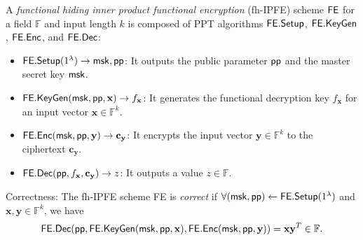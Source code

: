 \begin{definition}
\label{def:fh-IPFE}
	A \emph{functional hiding inner product functional encryption} (fh-IPFE) scheme $\sf FE$ for a field $\mathbb{F}$ and input length $k$ is composed of PPT algorithms ${\sf FE.Setup}$, ${\sf FE.KeyGen}$, ${\sf FE.Enc}$, and ${\sf FE.Dec}$:

	\begin{itemize}
	
		\item ${\sf FE.Setup}(1^\lambda) \to {\sf msk}, {\sf pp}$: It outputs the public parameter ${\sf pp}$ and the master secret key ${\sf msk}$.
	
		\item ${\sf FE.KeyGen}({\sf msk}, {\sf pp}, \mathbf{x}) \to f_\mathbf{x}$: It generates the functional decryption key $f_\mathbf{x}$ for an input vector $\mathbf{x} \in \mathbb{F}^k$. 
	
		\item ${\sf FE.Enc}({\sf msk}, {\sf pp}, \mathbf{y}) \to \mathbf{c_y}$: It encrypts the input vector $\mathbf{y} \in \mathbb{F}^k$ to the ciphertext $\mathbf{c_y}$. 
	
		\item ${\sf FE.Dec}({\sf pp}, f_\mathbf{x}, \mathbf{c_y}) \to z$: It outputs a value $z \in \mathbb{F}$.
	
	\end{itemize}
	
	\noindent Correctness: The fh-IPFE scheme {\sf FE} is \emph{correct} if $\forall ({\sf msk}, {\sf pp}) \gets {\sf FE.Setup}(1^\lambda)$ and $ \mathbf{x}, \mathbf{y} \in \mathbb{F}^k$, we have
	\[
		{\sf FE.Dec}( {\sf pp}, {\sf FE.KeyGen}({\sf msk}, {\sf pp}, \mathbf{x}), {\sf FE.Enc}({\sf msk}, {\sf pp}, \mathbf{y}) ) = \mathbf{x} \mathbf{y}^T \in \mathbb{F}.
	\]

\end{definition}


